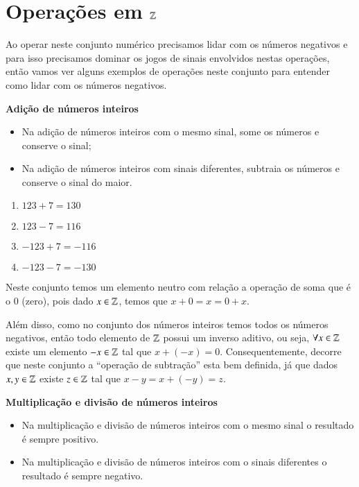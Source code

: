  \section{Operações em \texorpdfstring{$\mathbb{Z}$}{Z}}

 Ao operar neste conjunto numérico precisamos lidar com os números negativos e para isso precisamos dominar os jogos de sinais envolvidos nestas operações, então vamos ver alguns exemplos de operações neste conjunto para entender como lidar com os números negativos.

   \vskip0.3cm

 \textbf{Adição de números inteiros}

 \begin{itemize}
  \item Na adição de números inteiros com o mesmo sinal, some os números e conserve o sinal;
  \item Na adição de números inteiros com sinais diferentes, subtraia os números e conserve o sinal do maior.
 \end{itemize}

  \begin{enumerate}[1)]
   \item $123 + 7= 130$
   \item $123 - 7= 116$
   \item $-123 + 7 = -116$
   \item $-123 - 7 = -130$
 \end{enumerate}

  Neste conjunto temos um elemento neutro com relação a operação de soma que é o $0$ (zero), pois dado $x \in \mathbb{Z}$, temos que $x+0=x=0+x$.

 Além disso, como no conjunto dos números inteiros temos todos os números negativos, então todo elemento de $\mathbb{Z}$ possui um inverso aditivo, ou seja, $\forall x \in \mathbb{Z}$ existe um elemento $-x \in \mathbb{Z}$ tal que $x + (-x)=0$. Consequentemente, decorre que neste conjunto a ``operação de subtração'' esta bem definida, já que dados $x, y \in \mathbb{Z}$ existe $z \in \mathbb{Z}$ tal que $x - y= x+ (-y)= z$.

   \vskip0.3cm

 \textbf{Multiplicação e divisão de números inteiros}

  \begin{itemize}
   \item Na multiplicação e divisão de números inteiros com o mesmo sinal o resultado é sempre positivo.
   \item Na multiplicação e divisão de números inteiros com o sinais diferentes o resultado é sempre negativo.
  \end{itemize}

